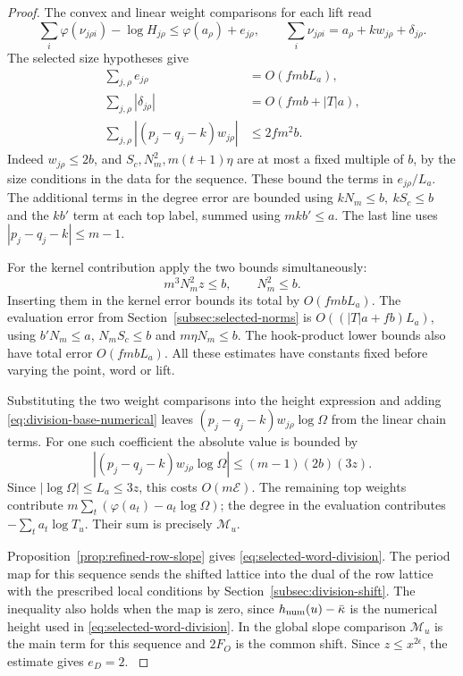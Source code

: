 \begin{proof}
The convex and linear weight comparisons for each lift read
\[
 \sum_i\varphi(\nu_{j\rho i})-\log H_{j\rho}
          \le \varphi(a_\rho)+e_{j\rho},\qquad
 \sum_i\nu_{j\rho i}=a_\rho+kw_{j\rho}+\delta_{j\rho}.
\]
The selected size hypotheses give
\[
\begin{split}
 \sum_{j,\rho}e_{j\rho}&=O(fmbL_a),\\
 \sum_{j,\rho}|\delta_{j\rho}|&=O(fmb+|T|a),\\
 \sum_{j,\rho}|(p_j-q_j-k)w_{j\rho}|&\le2fm^2b .
\end{split}
\]
Indeed \(w_{j\rho}\le2b\), and \(S_c,N_m^2,m(t+1)\eta\)
are at most a fixed multiple of \(b\), by the size
conditions in the data for the sequence. These bound the terms in
\(e_{j\rho}/L_a\). The additional terms in the degree
error are bounded using \(kN_m\le b,\ kS_c\le b\)
and the \(k b'\) term at each top label, summed using
\(mkb'\le a\). The last line uses \(|p_j-q_j-k|\le m-1\).

For the kernel contribution apply the two bounds simultaneously:
\[
  m^3N_m^2z\le b,\qquad N_m^2\le b.
\]
Inserting them in the kernel error bounds its total by \(O(fmbL_a)\). The evaluation error from
Section~\ref{subsec:selected-norms} is
\(O((|T|a+f b)L_a)\), using \(b'N_m\le a\),
\(N_m S_c\le b\) and \(m\eta N_m\le b\).
The hook-product lower bounds also have total error
\(O(fmbL_a)\). All these estimates have constants fixed
before varying the point, word or lift.

Substituting the two weight comparisons into the height
expression and adding \eqref{eq:division-base-numerical}
leaves \((p_j-q_j-k)w_{j\rho}\log\Omega\) from the linear
chain terms.
For one such coefficient the absolute value is bounded by
\[
  |(p_j-q_j-k)w_{j\rho}\log\Omega|\le (m-1)(2b)(3z).
\]
 Since \(|\log\Omega|\le L_a\le3z\), this
costs \(O(m\mathcal E)\). The remaining top weights contribute
\(m\sum_t(\varphi(a_t)-a_t\log\Omega)\); the degree in the evaluation
contributes \(-\sum_t a_t\log T_u\). Their sum is precisely
\(\mathcal M_u\).

Proposition~\ref{prop:refined-row-slope} gives
\eqref{eq:selected-word-division}.
The period map for this sequence sends the shifted lattice
into the dual of the row lattice with the prescribed local
conditions by Section~\ref{subsec:division-shift}. The
inequality also holds when the map is zero, since
\(h_{\rm num}(u)-\bar\kappa\) is the numerical height used
in \eqref{eq:selected-word-division}.
In the global slope comparison \(\mathcal M_u\) is the main
term for this sequence and \(2F_O\) is the common shift.
Since \(z\le x^{2\epsilon}\), the estimate gives \(e_D=2\).
\label{cor:word-division-8}
\end{proof}

